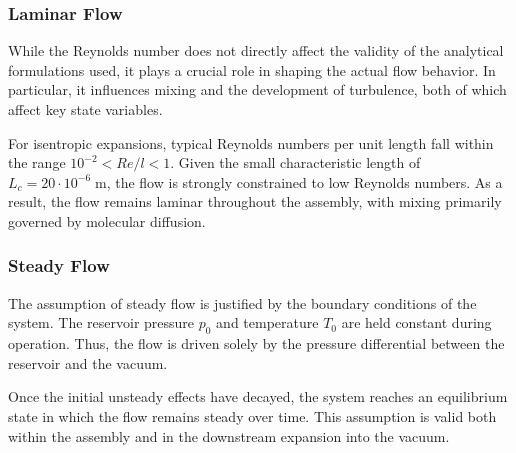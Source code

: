 \subsubsection*{Laminar Flow}
	While the Reynolds number does not directly affect the validity of the analytical formulations used, it plays a crucial role in shaping the actual flow behavior.
	In particular, it influences mixing and the development of turbulence, both of which affect key state variables.

	For isentropic expansions, typical Reynolds numbers per unit length fall within the range $10^{-2} < Re/l < 1$.
	Given the small characteristic length of $L_c = 20 \cdot 10^{-6}\;\text{m}$, the flow is strongly constrained to low Reynolds numbers.
	\cite{ames1953compressible}
	As a result, the flow remains laminar throughout the assembly, with mixing primarily governed by molecular diffusion.
	\cite{comsol_microfluidics_guide}

\subsubsection*{Steady Flow}
	The assumption of steady flow is justified by the boundary conditions of the system.
	The reservoir pressure $p_0$ and temperature $T_0$ are held constant during operation.
	Thus, the flow is driven solely by the pressure differential between the reservoir and the vacuum.

	Once the initial unsteady effects have decayed, the system reaches an equilibrium state in which the flow remains steady over time.
	This assumption is valid both within the assembly and in the downstream expansion into the vacuum.
	\cite{LiLam1964}
